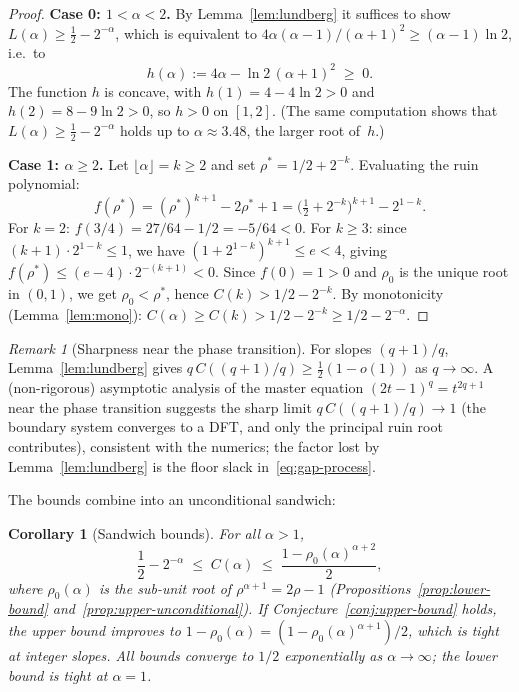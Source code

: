 \documentclass[11pt]{article}
\newtheorem{corollary}[theorem]{Corollary}
\theoremstyle{definition}
\theoremstyle{remark}
\newtheorem{remark}[theorem]{Remark}
\newcommand{\floor}[1]{\lfloor #1 \rfloor}
\begin{document}
\begin{proof}
\textbf{Case 0: $1 < \alpha < 2$.}
By Lemma~\ref{lem:lundberg} it suffices to show
$L(\alpha) \geq \tfrac{1}{2} - 2^{-\alpha}$, which is equivalent to
$4\alpha(\alpha-1)/(\alpha+1)^2 \geq (\alpha-1)\ln 2$, i.e.\ to
\[
h(\alpha) := 4\alpha - \ln 2\,(\alpha+1)^2 \;\geq\; 0.
\]
The function $h$ is concave, with $h(1) = 4 - 4\ln 2 > 0$ and
$h(2) = 8 - 9\ln 2 > 0$, so $h > 0$ on $[1, 2]$.
(The same computation shows that $L(\alpha) \geq \tfrac12 -
2^{-\alpha}$ holds up to $\alpha \approx 3.48$, the larger root
of~$h$.)

\smallskip\noindent
\textbf{Case 1: $\alpha \geq 2$.}
Let $\floor{\alpha} = k \geq 2$ and set $\rho^* = 1/2 + 2^{-k}$.
Evaluating the ruin polynomial:
\[
f(\rho^*) = (\rho^*)^{k+1} - 2\rho^* + 1
= \bigl(\tfrac{1}{2} + 2^{-k}\bigr)^{k+1} - 2^{1-k}.
\]
For $k = 2$: $f(3/4) = 27/64 - 1/2 = -5/64 < 0$.
For $k \geq 3$: since $(k+1) \cdot 2^{1-k} \leq 1$, we have
$(1 + 2^{1-k})^{k+1} \leq e < 4$,
giving $f(\rho^*) \leq (e - 4) \cdot 2^{-(k+1)} < 0$.
Since $f(0) = 1 > 0$ and $\rho_0$ is the unique root in $(0,1)$,
we get $\rho_0 < \rho^*$, hence $C(k) > 1/2 - 2^{-k}$.
By monotonicity (Lemma~\ref{lem:mono}):
$C(\alpha) \geq C(k) > 1/2 - 2^{-k} \geq 1/2 - 2^{-\alpha}$.
\end{proof}

\begin{remark}[Sharpness near the phase transition]
For slopes $(q+1)/q$, Lemma~\ref{lem:lundberg} gives
$q\,C((q+1)/q) \geq \tfrac{1}{2}(1 - o(1))$ as $q \to \infty$.
A (non-rigorous) asymptotic analysis of the master equation
$(2t-1)^q = t^{2q+1}$ near the phase transition suggests the sharp
limit $q\,C((q+1)/q) \to 1$ (the boundary system converges to a
DFT, and only the principal ruin root contributes), consistent with
the numerics; the factor lost by Lemma~\ref{lem:lundberg} is the
floor slack in~\eqref{eq:gap-process}.
\end{remark}

The bounds combine into an unconditional sandwich:

\begin{corollary}[Sandwich bounds]\label{cor:sandwich}
For all $\alpha > 1$,
\[
\frac{1}{2} - 2^{-\alpha} \;\leq\; C(\alpha)
\;\leq\; \frac{1 - \rho_0(\alpha)^{\alpha+2}}{2},
\]
where $\rho_0(\alpha)$ is the sub-unit root of
$\rho^{\alpha+1} = 2\rho - 1$
(Propositions~\ref{prop:lower-bound}
and~\ref{prop:upper-unconditional}).
If Conjecture~\ref{conj:upper-bound} holds, the upper bound improves
to $1 - \rho_0(\alpha) = (1 - \rho_0(\alpha)^{\alpha+1})/2$, which is
tight at integer slopes.
All bounds converge to $1/2$ exponentially as $\alpha \to \infty$;
the lower bound is tight at $\alpha = 1$.
\end{corollary}
\end{document}
